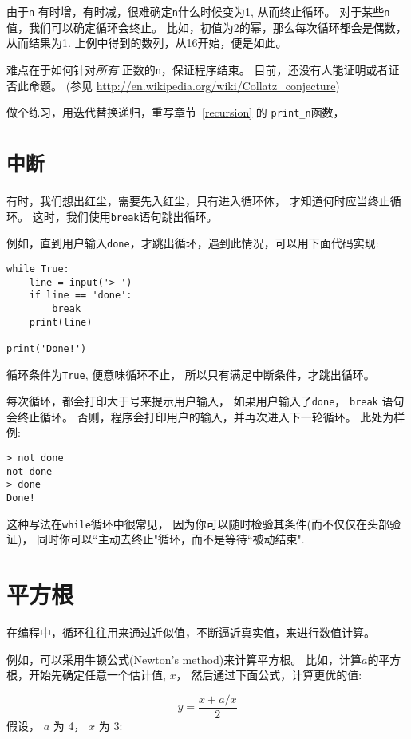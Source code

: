\documentclass[10pt]{book}
\begin{document}
由于{\tt n} 有时增，有时减，很难确定{\tt n}什么时候变为1, 从而终止循环。
对于某些{\tt n}值，我们可以确定循环会终止。
比如，初值为2的幂，那么每次循环都会是偶数，从而结果为1.
上例中得到的数列，从16开始，便是如此。

难点在于如何针对{\em 所有} 正数的{\tt n}，保证程序结束。
目前，还没有人能证明或者证否此命题。
(参见 \url{http://en.wikipedia.org/wiki/Collatz_conjecture})

做个练习，用迭代替换递归，重写章节~\ref{recursion} 的 \verb"print_n"函数，

\section{{\tt 中断}}
有时，我们想出红尘，需要先入红尘，只有进入循环体，
才知道何时应当终止循环。
这时，我们使用{\tt break}语句跳出循环。

例如，直到用户输入{\tt done}，才跳出循环，遇到此情况，可以用下面代码实现:

\begin{verbatim}
while True:
    line = input('> ')
    if line == 'done':
        break
    print(line)

print('Done!')
\end{verbatim}
%
循环条件为{\tt True}, 便意味循环不止， 所以只有满足中断条件，才跳出循环。

每次循环，都会打印大于号来提示用户输入，
如果用户输入了{\tt done}， {\tt break} 语句会终止循环。
否则，程序会打印用户的输入，并再次进入下一轮循环。
此处为样例:

\begin{verbatim}
> not done
not done
> done
Done!
\end{verbatim}
%
这种写法在{\tt while}循环中很常见，
因为你可以随时检验其条件(而不仅仅在头部验证)，
同时你可以``主动去终止"循环，而不是等待``被动结束".


\section{平方根}
\label{squareroot}

在编程中，循环往往用来通过近似值，不断逼近真实值，来进行数值计算。

例如，可以采用牛顿公式(Newton's method)来计算平方根。
比如，计算$a$的平方根，开始先确定任意一个估计值, $x$，
然后通过下面公式，计算更优的值:

\[ y = \frac{x + a/x}{2} \]
%
假设， $a$ 为 4， $x$ 为 3:
\end{document}
